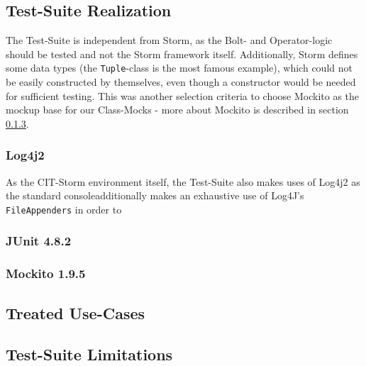 \subsection{Test-Suite Realization}
\label{sect:TestSuiteRealization}
	The Test-Suite is independent from Storm, as the Bolt- and Operator-logic should be tested and not the Storm framework itself. Additionally, Storm defines some data types (the \texttt{Tuple}-class is the most famous example), which could not be easily constructed by themselves, even though a constructor would be needed for sufficient testing. This was another selection criteria to choose Mockito as the mockup base for our Class-Mocks - more about Mockito is described in section \ref{sect:Mockito}. \\
	
	\subsubsection{Log4j2}
		As the CIT-Storm environment itself, the Test-Suite also makes uses of Log4j2 as the standard consoleadditionally makes an exhaustive use of Log4J's \texttt{FileAppenders} in order to 
	
	\subsubsection{JUnit 4.8.2}
	
	\subsubsection{Mockito 1.9.5}
	\label{sect:Mockito}
	

\subsection{Treated Use-Cases}
\label{sect:TestSuiteUseCases}
	

\subsection{Test-Suite Limitations}
\label{sect:TestSuiteLimitations}
	